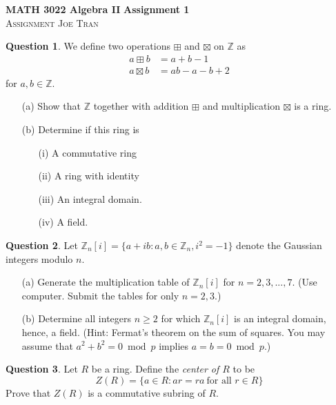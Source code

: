 \documentclass[11pt]{amsart}
\theoremstyle{definition}\newtheorem{definition}{Definition}
\theoremstyle{definition}\newtheorem{question}{Question}
\theoremstyle{definition}\newtheorem*{solution}{Solution}
\theoremstyle{definition}\newtheorem{example}{Example}
\theoremstyle{definition}\newtheorem{notation}{Notation}
\theoremstyle{theorem}\newtheorem{theorem}{Theorem}
\theoremstyle{theorem}\newtheorem{corollary}{Corollary}
\theoremstyle{theorem}\newtheorem{lemma}{Lemma}
\theoremstyle{theorem}\newtheorem{proposition}{Proposition}
\newcommand{\Z}{\mathbb{Z}}
\begin{document}
\noindent \textbf{MATH 3022 Algebra II} \hfill \textbf{Assignment 1} \\
\textsc{Assignment} \hfill \textsc{Joe Tran}

\begin{question}\label{question:1}
    We define two operations $\boxplus$ and $\boxtimes$ on $\Z$ as
    \begin{align*}
        a \boxplus b &= a + b - 1 \\
        a \boxtimes b &= ab - a - b + 2
    \end{align*}
    for $a, b \in \Z$.
    \begin{itemize}
        \item[(a)] Show that $\Z$ together with addition $\boxplus$ and multiplication $\boxtimes$ is a ring.
        \item[(b)] Determine if this ring is
        \begin{itemize}
            \item[(i)] A commutative ring
            \item[(ii)] A ring with identity
            \item[(iii)] An integral domain.
            \item[(iv)] A field.
        \end{itemize}
    \end{itemize}
\end{question}

\begin{question}
    Let $\Z_n[i] = \{a + ib : a, b \in \Z_n, i^2 = -1\}$ denote the Gaussian integers modulo $n$.
    \begin{itemize}
        \item[(a)] Generate the multiplication table of $\Z_n[i]$ for $n = 2, 3, ..., 7$. (Use computer. Submit the tables for only $n = 2, 3$.)
        \item[(b)] Determine all integers $n \geq 2$ for which $\Z_n[i]$ is an integral domain, hence, a field. (Hint: Fermat's theorem on the sum of squares. You may assume that $a^2 + b^2 = 0 \bmod p$ implies $a = b = 0 \bmod p$.)
    \end{itemize}
\end{question}

\begin{question}
    Let $R$ be a ring. Define the \emph{center of $R$} to be
    \begin{equation*}
        Z(R) = \{a \in R : ar = ra \ \text{for all $r \in R$}\}
    \end{equation*}
    Prove that $Z(R)$ is a commutative subring of $R$.
\end{question}
\end{document}
